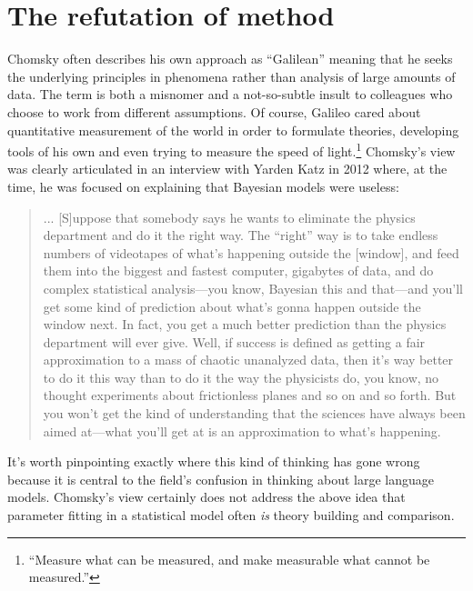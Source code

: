 \documentclass[output=paper,colorlinks,citecolor=brown
]{langscibook}
\begin{document}

\section*{The refutation of method}

Chomsky often describes his own approach as ``Galilean'' meaning that he seeks the underlying principles in phenomena rather than analysis of large amounts of data. The term is both a misnomer \citep{behme2014galilean} and a not-so-subtle insult to colleagues who choose to work from different assumptions. Of course,  Galileo cared about quantitative measurement of the world in order to formulate theories, developing tools of his own and even trying to measure the speed of light.\footnote{ ``Measure what can be measured, and make measurable what cannot be measured.''} Chomsky's view was clearly articulated in an interview with Yarden Katz in 2012 where, at the time, he was focused on explaining that Bayesian models were useless: 
\begin{quote}
... [S]uppose that somebody says he wants to eliminate the physics department and do it the right way. The ``right'' way is to take endless numbers of videotapes of what's happening outside the [window], and feed them into the biggest and fastest computer, gigabytes of data, and do complex statistical analysis---you know, Bayesian this and that---and you'll get some kind of prediction about what's gonna happen outside the window next. In fact, you get a much better prediction than the physics department will ever give. Well, if success is defined as getting a fair approximation to a mass of chaotic unanalyzed data, then it's way better to do it this way than to do it the way the physicists do, you know, no thought experiments about frictionless planes and so on and so forth. But you won't get the kind of understanding that the sciences have always been aimed at—what you'll get at is an approximation to what's happening.
\end{quote}
It's worth pinpointing exactly where this kind of thinking has gone wrong because it is central to the field's confusion in thinking about large language models. Chomsky's view certainly does not address the above idea that parameter fitting in a statistical model often \emph{is} theory building and comparison. %
\end{document}
